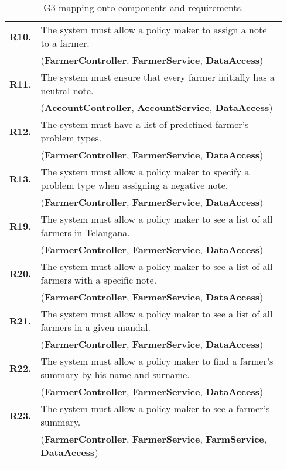 \begin{longtable}{p{0.06\linewidth} p{0.88\linewidth}}
	\textbf{R10.} & The system must allow a policy maker to assign a note to a farmer.\\
	& (\textbf{FarmerController}, \textbf{FarmerService}, \textbf{DataAccess})\\
	\textbf{R11.} & The system must ensure that every farmer initially has a neutral note.\\	& (\textbf{AccountController}, \textbf{AccountService}, \textbf{DataAccess}) \todo{changed from farmer- to account-}\\
	\textbf{R12.} & The system must have a list of predefined farmer's problem types.\\
	& (\textbf{FarmerController}, \textbf{FarmerService}, \textbf{DataAccess}) \\
    \textbf{R13.} & The system must allow a policy maker to specify a problem type when assigning a negative note.\\
    & (\textbf{FarmerController}, \textbf{FarmerService}, \textbf{DataAccess})\\
	\textbf{R19.} & The system must allow a policy maker to see a list of all farmers in Telangana.\\
	& (\textbf{FarmerController}, \textbf{FarmerService}, \textbf{DataAccess})\\
	\textbf{R20.} & The system must allow a policy maker to see a list of all farmers with a specific note.\\
	& (\textbf{FarmerController}, \textbf{FarmerService}, \textbf{DataAccess})\\
	\textbf{R21.} & The system must allow a policy maker to see a list of all farmers in a given mandal.\\
	& (\textbf{FarmerController}, \textbf{FarmerService}, \textbf{DataAccess})\\
	\textbf{R22.} & The system must allow a policy maker to find a farmer's summary by his name and surname.\\
	& (\textbf{FarmerController}, \textbf{FarmerService}, \textbf{DataAccess})\\
	\textbf{R23.} & The system must allow a policy maker to see a farmer's summary.\\
	& (\textbf{FarmerController}, \textbf{FarmerService}, \textbf{FarmService}, \textbf{DataAccess})\\
    
    \bottomrule
\caption{G3 mapping onto components and requirements.}
\end{longtable}


